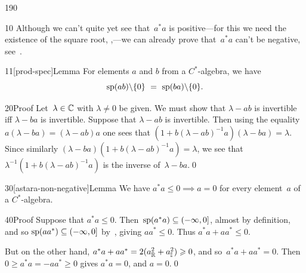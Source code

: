 \begin{parsec}{190}
\begin{point}{10}%
Although we can't quite yet see that~$a^*a$
is positive---for this we need the existence of the square root, 
    ,---we
    can already prove that~$a^*a$ can't be negative,
    see~.
\end{point}
\begin{point}{11}[prod-spec]{Lemma}%
For elements $a$ and $b$ from a $C^*$-algebra,
we have
\begin{equation*}
\spec(ab)\backslash\{0\}\ =\ \spec(ba)\backslash\{0\}.
\end{equation*}%
\spacingfix{}%
\begin{point}{20}{Proof}%
Let~$\lambda\in \mathbb{C}$ with $\lambda\neq 0$ be given.
We must show that $\lambda - ab$ is invertible
iff $\lambda - ba$ is invertible.
Suppose that $\lambda-ab$ is invertible.
Then using the equality $a(\lambda-ba)=(\lambda-ab)a$
one sees that $(1+b(\lambda-ab)^{-1}a)(\lambda-ba)=\lambda$.
Since similarly $(\lambda-ba)(1+b(\lambda-ab)^{-1}a)=\lambda$,
we see that $\lambda^{-1}(1+b(\lambda-ab)^{-1}a)$
is the inverse of~$\lambda-ba$.\qed
\end{point}
\end{point}
\begin{point}{30}[astara-non-negative]{Lemma}%
We have $a^*a  \leq 0\implies a=0$
for every element~$a$ of a $C^*$-algebra.
\begin{point}{40}{Proof}%
Suppose that $a^*a\leq 0$.
Then~$\mathrm{sp}(a^*a)\subseteq (-\infty,0]$, almost by definition,
and so $\mathrm{sp}(aa^*)\subseteq (-\infty,0]$ by~,
giving $aa^*\leq 0$.
Thus $a^*a+aa^*\leq 0$.

But on the other hand, 
$a^*a+aa^* = 2(a_{\mathbb{R}}^2 + a_{\mathbb{I}}^2) \geqslant 0$,
and so~$a^*a+aa^*=0$.
Then $0\geq a^*a=-aa^*\geq 0$ gives $a^*a=0$,
and $a=0$.\qed
\end{point}
\end{point}
\end{parsec}
